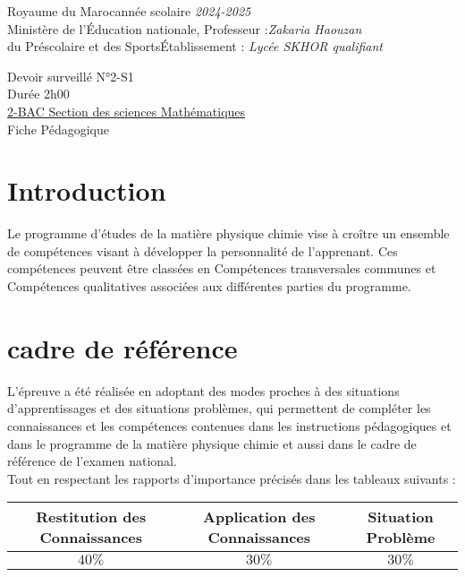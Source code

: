 \documentclass[12pt]{article}
\newcommand\headerMe[2]{\noindent{}#1\hfill#2}
\begin{document}
\headerMe{Royaume du Maroc}{année scolaire \emph{2024-2025}}\\
\headerMe{Ministère de l'Éducation nationale, }{  Professeur :\emph{Zakaria Haouzan}}\\
\headerMe{du Préscolaire et des Sports}{Établissement : \emph{Lycée SKHOR qualifiant}}\\

\begin{center}
Devoir surveillé N°2-S1 \\
Durée 2h00\\
\underline{2-BAC Section des sciences Mathématiques}\\

    \vspace{.2cm}
\hrulefill
\Large{Fiche Pédagogique}
\hrulefill\\
\end{center}


\section[A]{Introduction }
\hspace{0.5cm}Le programme d'études de la matière physique chimie vise à croître un ensemble de compétences visant à développer la personnalité de l'apprenant. Ces compétences peuvent être classées en Compétences transversales communes et Compétences qualitatives associées aux différentes parties du programme.
\section{cadre de référence }
 \hspace{0.5cm}L'épreuve a été réalisée en adoptant des modes proches à des situations d'apprentissages et des situations problèmes, qui permettent de compléter les connaissances et les compétences contenues dans les instructions pédagogiques et dans le programme de la matière physique chimie et aussi dans le cadre de référence de l'examen national. 
 \\Tout en respectant les rapports d'importance précisés dans les tableaux suivants :
 \begin{center}
\begin{tabular}{|c||c||c|}
\hline
    \textbf{Restitution des Connaissances} & \textbf{Application des Connaissances} & \textbf{Situation Problème }\\
    \hline 
    $40\%$ & $30\%$ & $30\%$\\
    \hline
\end{tabular} 
\end{center}
\end{document}
